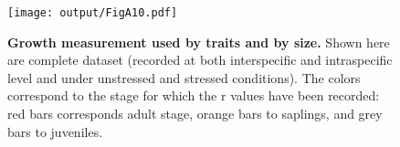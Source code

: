 \documentclass[a4paper]{article}\usepackage[]{graphicx}\usepackage[]{color}
\begin{document}
\begin{appendices}
\begin{figure}[htbp]
\label{FigA9}
\end{figure}

\begin{figure}[htbp]
\centering
\texttt{[image: output/FigA10.pdf]}
\caption{\textbf{Growth measurement used by traits and by size.} Shown here are complete dataset (recorded at both interspecific and intraspecific level and under unstressed and stressed conditions). The colors correspond to the stage for which the r values have been recorded: red bars corresponds adult stage, orange bars to saplings, and grey bars to juveniles.}
\label{FigA10}
\end{figure}

\end{appendices}
\end{document}
